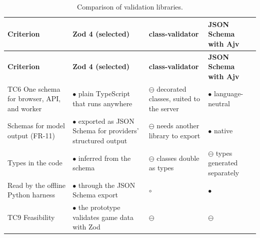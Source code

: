 {\small
\begin{longtable}{|>{\raggedright\arraybackslash}p{}|>{\raggedright\arraybackslash}p{}|>{\raggedright\arraybackslash}p{}|>{\raggedright\arraybackslash}p{}|}
\caption{Comparison of validation libraries.} \\
\hline
\textbf{Criterion} & \textbf{Zod 4 (selected)} & \textbf{class-\allowbreak{}validator\cite{r188}} & \textbf{JSON Schema with Ajv\cite{r189}} \\ \hline
\endfirsthead
\hline
\textbf{Criterion} & \textbf{Zod 4 (selected)} & \textbf{class-\allowbreak{}validator\cite{r188}} & \textbf{JSON Schema with Ajv\cite{r189}} \\ \hline
\endhead
TC6 One schema for browser, API, and worker & $\bullet$ plain TypeScript that runs anywhere & $\ominus$ decorated classes, suited to the server & $\bullet$ language-\allowbreak{}neutral \\ \hline
Schemas for model output (FR-11) & $\bullet$ exported as JSON Schema for providers' structured output\cite{r190} & $\ominus$ needs another library to export & $\bullet$ native \\ \hline
Types in the code & $\bullet$ inferred from the schema & $\ominus$ classes double as types & $\ominus$ types generated separately \\ \hline
Read by the offline Python harness & $\bullet$ through the JSON Schema export & $\circ$ & $\bullet$ \\ \hline
TC9 Feasibility & $\bullet$ the prototype validates game data with Zod & $\ominus$ & $\ominus$ \\ \hline
\end{longtable}
}


